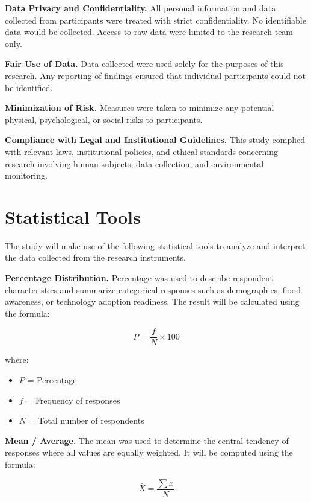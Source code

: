 \documentclass{research}
\begin{document}
\textbf{Data Privacy and Confidentiality.} All personal information and data collected from participants were treated with strict confidentiality. No identifiable data would be collected. Access to raw data were limited to the research team only.

\textbf{Fair Use of Data.} Data collected were used solely for the purposes of this research. Any reporting of findings ensured that individual participants could not be identified.

\textbf{Minimization of Risk.} Measures were taken to minimize any potential physical, psychological, or social risks to participants.

\textbf{Compliance with Legal and Institutional Guidelines.} This study complied with relevant laws, institutional policies, and ethical standards concerning research involving human subjects, data collection, and environmental monitoring.

\section{Statistical Tools}

The study will make use of the following statistical tools to analyze and interpret the data collected from the research instruments.

\textbf{Percentage Distribution.} Percentage was used to describe respondent characteristics and summarize categorical responses such as demographics, flood awareness, or technology adoption readiness. The result will be calculated using the formula:

\begin{equation}
    P = \frac{f}{N} \times 100
\end{equation}

\noindent where:
\begin{itemize}
    \item $P$ = Percentage
    \item $f$ = Frequency of responses
    \item $N$ = Total number of respondents
\end{itemize}

\textbf{Mean / Average.} The mean was used to determine the central tendency of responses where all values are equally weighted. It will be computed using the formula:

\begin{equation}
    \bar{X} = \frac{\sum x}{N}
\end{equation}
\end{document}
